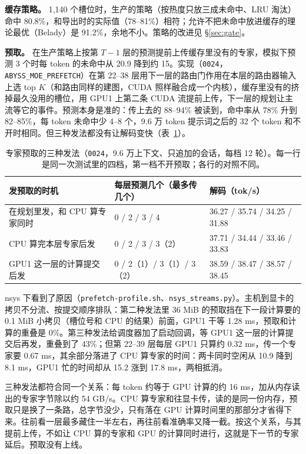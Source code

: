 \documentclass[11pt,a4paper]{article}
\newcommand{\code}[1]{\texttt{#1}}
\newcommand{\tps}{tok/s}
\begin{document}
\textbf{缓存策略。} 1,140 个槽位时，生产的策略（按热度只放三成未命中、LRU 淘汰）命中 80.8\%，和导出时的实际值（78--81\%）相符；允许不把未命中放进缓存的理论最优（Belady）是 91.2\%，余地不小。策略的改进见 \S\ref{sec:gate}。

\textbf{预取。} 在生产策略上按第 $T-1$ 层的预测提前上传缓存里没有的专家，模拟下预测 3 个时每 token 的未命中从 20.9 降到约 15。实现（\code{0024}，\code{ABYSS\_MOE\_PREFETCH}）在第 22--38 层用下一层的路由门作用在本层的路由器输入上选 top $K$（和路由同样的建图，CUDA 照样融合成一个内核），缓存里没有的挤掉最久没用的槽位，用 GPU1 上第二条 CUDA 流提前上传，下一层的规划让主流等它的事件。预测本身是准的：传上去的 88--94\% 被读到，命中率从 78\% 升到 82--85\%，每 token 未命中少 4--8 个，9.6 万 token 提示词之后的 32 个 token 和不开时相同。但三种发法都没有让解码变快（表~\ref{tab:prefetch}）。

\begin{table}[h]
  \centering
  \small
  \caption{专家预取的三种发法（\code{0024}，9.6 万上下文、只追加的会话，每档 12 轮）。每一行是同一次测试里的四档，第一档不开预取；各行的对照不同。}
  \label{tab:prefetch}
  \begin{tabular}{@{}l l l@{}}
    \toprule
    发预取的时机 & 每层预测几个（最多传几个） & 解码（\tps） \\
    \midrule
    在规划里发，和 CPU 算专家同时 & 0 / 2 / 3 / 4 & 36.27 / 35.74 / 34.25 / 31.88 \\
    CPU 算完本层专家后发 & 0 / 2 / 3 / 3（2） & 37.71 / 34.44 / 33.46 / 33.83 \\
    GPU1 这一层的计算提交后发 & 0 / 2（1）/ 3（1）/ 3（2） & 38.59 / 38.47 / 38.57 / 38.45 \\
    \bottomrule
  \end{tabular}
\end{table}

nsys 下看到了原因（\code{prefetch-profile.sh}、\code{nsys\_streams.py}）。主机到显卡的拷贝不分流、按提交顺序排队：第二种发法里 36 MiB 的预取挡在下一段计算要的 0.1 MiB 小拷贝（槽位号和 CPU 的结果）前面，GPU1 干等 1.28 ms，预取和计算的重叠是 0\%。第三种发法给调度器加了启动回调，等 GPU1 这一层的计算提交后再发，重叠到了 43\%；但第 22--39 层每层 GPU1 只算约 0.32 ms，传一个专家要 0.67 ms，其余部分落进了 CPU 算专家的时间：两卡同时空闲从 10.9 降到 8.1 ms，GPU1 忙的时间却从 15.2 涨到 17.8 ms，两相抵消。

三种发法都符合同一个关系：每 token 约等于 GPU 计算的约 16 ms，加从内存读出的专家字节除以约 54 GB/s。CPU 算专家和往显卡传，读的是同一份内存，预取只是换了一条路，总字节没少，只有落在 GPU 计算时间里的那部分才省得下来。往前看一层最多藏住一半左右，再往前看准确率又降一截。按这个关系，与其提前上传，不如让 CPU 算的专家和 GPU 的计算同时进行，这就是下一节的专家延后。预取没有上线。
\end{document}
